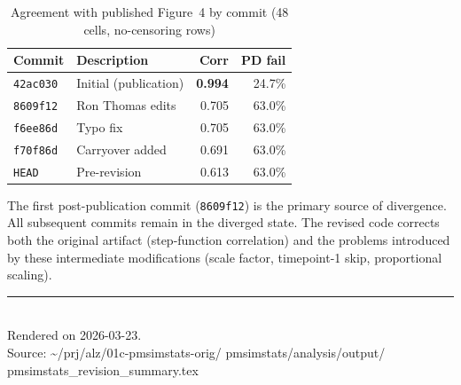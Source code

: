 \documentclass[11pt]{article}
\begin{document}
\begin{table}[h]
\centering
\caption{Agreement with published Figure~4 by commit
  (48 cells, no-censoring rows)}
\begin{tabular}{llrr}
\toprule
Commit & Description & Corr & PD fail \\
\midrule
\texttt{42ac030} & Initial (publication) &
  \textbf{0.994} & 24.7\% \\
\texttt{8609f12} & Ron Thomas edits &
  0.705 & 63.0\% \\
\texttt{f6ee86d} & Typo fix &
  0.705 & 63.0\% \\
\texttt{f70f86d} & Carryover added &
  0.691 & 63.0\% \\
\texttt{HEAD} & Pre-revision &
  0.613 & 63.0\% \\
\bottomrule
\end{tabular}
\end{table}

The first post-publication commit (\texttt{8609f12}) is the
primary source of divergence. All subsequent commits remain
in the diverged state. The revised code corrects both the
original artifact (step-function correlation) and the
problems introduced by these intermediate modifications
(scale factor, timepoint-1 skip, proportional scaling).

\vfill
\noindent\rule{\textwidth}{0.4pt}\\
{\footnotesize Rendered on 2026-03-23.\\
Source: \textasciitilde/prj/alz/01c-pmsimstats-orig/%
pmsimstats/analysis/output/%
pmsimstats\_revision\_summary.tex}
\end{document}
